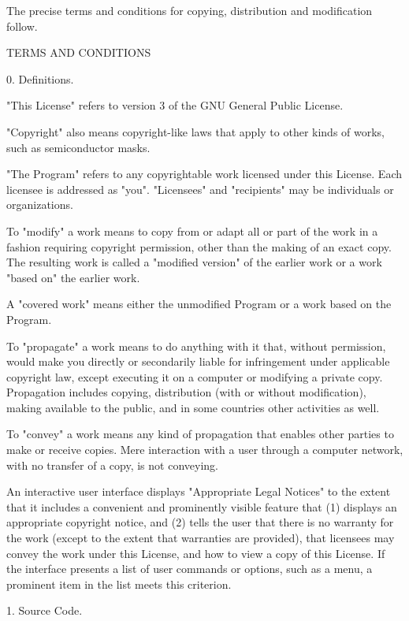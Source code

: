 \documentclass[11pt]{book}
\begin{document}
    The precise terms and conditions for copying, distribution and
    modification follow.

    TERMS AND CONDITIONS

    0. Definitions.

    "This License" refers to version 3 of the GNU General Public License.

    "Copyright" also means copyright-like laws that apply to other kinds of
    works, such as semiconductor masks.

    "The Program" refers to any copyrightable work licensed under this
    License.  Each licensee is addressed as "you".  "Licensees" and
    "recipients" may be individuals or organizations.

    To "modify" a work means to copy from or adapt all or part of the work
    in a fashion requiring copyright permission, other than the making of an
    exact copy.  The resulting work is called a "modified version" of the
    earlier work or a work "based on" the earlier work.

    A "covered work" means either the unmodified Program or a work based
    on the Program.

    To "propagate" a work means to do anything with it that, without
    permission, would make you directly or secondarily liable for
    infringement under applicable copyright law, except executing it on a
    computer or modifying a private copy.  Propagation includes copying,
    distribution (with or without modification), making available to the
    public, and in some countries other activities as well.

    To "convey" a work means any kind of propagation that enables other
    parties to make or receive copies.  Mere interaction with a user through
    a computer network, with no transfer of a copy, is not conveying.

    An interactive user interface displays "Appropriate Legal Notices"
    to the extent that it includes a convenient and prominently visible
    feature that (1) displays an appropriate copyright notice, and (2)
    tells the user that there is no warranty for the work (except to the
    extent that warranties are provided), that licensees may convey the
    work under this License, and how to view a copy of this License.  If
    the interface presents a list of user commands or options, such as a
    menu, a prominent item in the list meets this criterion.

    1. Source Code.
\end{document}
